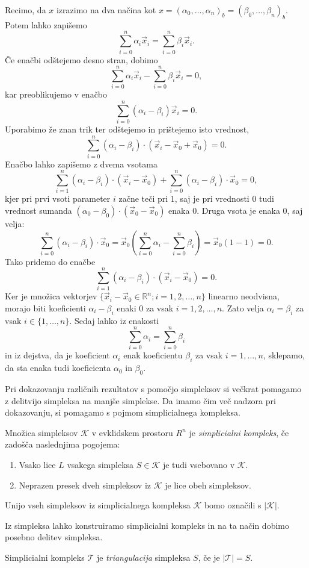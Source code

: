 \documentclass[mat1]{fmfdelo}
\newcommand{\R}{\mathbb R}
\newcommand{\0}{0}
\newcommand{\pK}{\mathcal K}
\newcommand{\pT}{\mathcal T}
\begin{document}
\begin{dokaz}
Recimo, da $x$ izrazimo na dva načina kot $x = \left (\alpha_0, \dots, \alpha_n \right )_b = \left (\beta_0, \dots, \beta_n \right )_b$. Potem lahko zapišemo 
$$\sum_{i=0}^n \alpha_i \vec{x}_i = \sum_{i=0}^n \beta_i \vec{x}_i.$$
Če enačbi odštejemo desno stran, dobimo 
$$\sum_{i=0}^n \alpha_i \vec{x}_i - \sum_{i=0}^n \beta_i \vec{x}_i = 0,$$
kar preoblikujemo v enačbo
$$\sum_{i=0}^n (\alpha_i - \beta_i) \vec{x}_i  = 0.$$
Uporabimo že znan trik ter odštejemo in prištejemo isto vrednost,
$$\sum_{i=0}^n (\alpha_i  - \beta_i) \cdot (\vec{x}_i - \vec{x}_0 + \vec{x}_0) = 0.$$
Enačbo lahko zapišemo z dvema vsotama
$$\sum_{i=1}^n (\alpha_i  - \beta_i) \cdot (\vec{x}_i -\vec{x}_0) + \sum_{i=0}^n (\alpha_i  - \beta_i) \cdot \vec{x}_0= 0,$$
kjer pri prvi vsoti parameter $i$ začne teči pri $1$, saj je pri vrednosti $0$ tudi vrednost sumanda  $(\alpha_0 - \beta_0) \cdot (\vec{x}_0 -\vec{x}_0)$ enaka $0$. Druga vsota je enaka $0$, saj velja:
$$\sum_{i=0}^n (\alpha_i  - \beta_i) \cdot \vec{x}_0= \vec{x}_0 \left (\sum_{i=0}^n \alpha_i  - \sum_{i=0}^n \beta_i \right) = \vec{x}_0 (1 - 1)= 0.$$
Tako pridemo do enačbe 
$$\sum_{i=1}^n (\alpha_i  - \beta_i) \cdot (\vec{x}_i - \vec{x}_0)=0.$$
Ker je množica vektorjev $\{ \vec{x}_i - \vec{x}_0 \in \R^n; i = 1, 2, \dots, n\}$ linearno neodvisna, morajo biti koeficienti $\alpha_i  - \beta_i $ enaki $0$ za vsak $i = 1, 2, \dots, n$. Zato velja $\alpha_i  = \beta_i$ za vsak $i \in \{ 1, \dots, n \}$. Sedaj lahko iz enakosti
$$\sum_{i=0}^n \alpha_i  = \sum_{i=0}^n \beta_i $$
in iz dejstva, da je koeficient $\alpha_i$ enak koeficientu $\beta_i$ za vsak $i = 1, \dots, n$, sklepamo, da sta enaka tudi koeficienta $\alpha_0$ in $\beta_0$.
\end{dokaz}

Pri dokazovanju različnih rezultatov s pomočjo simpleksov si večkrat pomagamo z delitvijo simpleksa na manjše simplekse. Da imamo čim več nadzora pri dokazovanju, si pomagamo s pojmom simplicialnega kompleksa.
\begin{definicija}%
Množica simpleksov $\pK$ v evklidskem prostoru $R^n$ je \emph{simplicialni kompleks}, če zadošča naslednjima pogojema:
\begin{enumerate}\label{simpl-kompleks}
\item Vsako lice $L$ vsakega simpleksa $S \in \pK$ je tudi vsebovano v $\pK$.\label{simpl-kompleks1}
\item Neprazen presek dveh simpleksov iz $\pK$ je lice obeh simpleksov.\label{simpl-kompleks2}
\end{enumerate}
Unijo vseh simpleksov iz simplicialnega kompleksa $\pK$ bomo označili s $| \pK |$.
\end{definicija}
Iz simpleksa lahko konstruiramo simplicialni kompleks in na ta način dobimo posebno delitev simpleksa.
\begin{definicija}
Simplicialni kompleks $\pT$ je \emph{triangulacija} simpleksa $S$, če je $|\pT| = S$.
\end{definicija}
\end{document}
